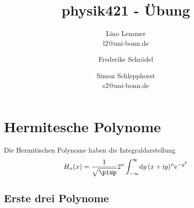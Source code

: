 

\setcounter{thezettel}{4}
\renewcommand\thesection{\arabic{thezettel}.\arabic{section}}


\title{physik421 - Übung }
\author{Lino Lemmer \\ \small{l2@uni-bonn.de} \and Frederike Schrödel \and Simon Schlepphorst\\ \small{s2@uni-bonn.de}}


\maketitle

\section{Hermitesche Polynome}

Die Hermitischen Polynome haben die Integraldarstellung
\[
    H_n(x) = \frac1{\sqrt\piup}2^n\int_{-\infty}^\infty\!\dif y\, (x + \ii y)^n \eexp{-y^2}
\]

\subsection{Erste drei Polynome}

